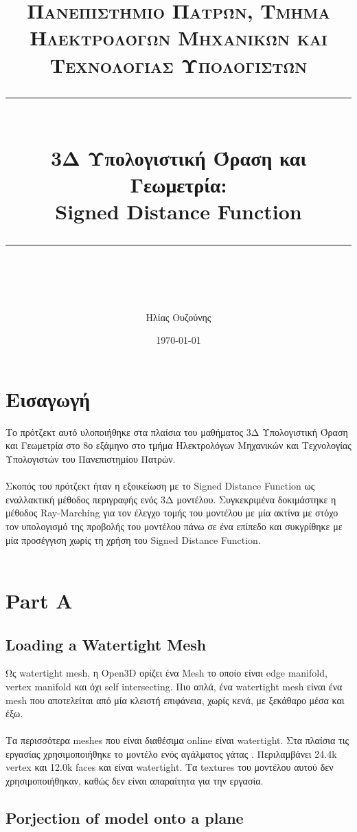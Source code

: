 \documentclass{report}
\title{	
	\normalfont\normalsize
	\textsc{Πανεπιστήμιο Πατρών, Τμήμα Ηλεκτρολόγων Μηχανικών και Τεχνολογίας Υπολογιστών}\\ %
	\vspace{25pt} %
	\rule{\linewidth}{0.5pt}\\ %
	\vspace{20pt} %
	{\huge 3Δ Υπολογιστική Όραση και Γεωμετρία: \\ Signed Distance Function}\\ %
	\vspace{12pt} %
	\rule{\linewidth}{2pt}\\ %
	\vspace{12pt} %
}
\author{\LARGE Ηλίας Ουζούνης \\ \en{up1083749}} %
\date{\normalsize\today} %
\begin{document}
\maketitle
\newpage

\sloppy
\tableofcontents
\newpage

\chapter{Εισαγωγή}
Το πρότζεκτ αυτό υλοποιήθηκε στα πλαίσια του μαθήματος 3Δ Υπολογιστική Όραση και Γεωμετρία στο 8ο εξάμηνο στο τμήμα Ηλεκτρολόγων
Μηχανικών και Τεχνολογίας Υπολογιστών του Πανεπιστημίου Πατρών.
\\\\
Σκοπός του πρότζεκτ ήταν η εξοικείωση με το Signed Distance Function ως εναλλακτική μέθοδος περιγραφής ενός 3Δ μοντέλου. 
Συγκεκριμένα δοκιμάστηκε η μέθοδος Ray-Marching για τον έλεγχο τομής του μοντέλου με μία ακτίνα με στόχο τον υπολογισμό
της προβολής του μοντέλου πάνω σε ένα επίπεδο και συκγρίθηκε με μία προσέγγιση χωρίς τη χρήση του Signed Distance Function.
\\\\

\chapter{Part A}
\section{Loading a Watertight Mesh}

Ως watertight mesh, η Open3D ορίζει ένα Mesh το οποίο είναι edge manifold, vertex manifold και όχι self intersecting. Πιο απλά,
ένα watertight mesh είναι ένα mesh που αποτελείται από μία κλειστή επιφάνεια, χωρίς κενά, με ξεκάθαρο μέσα και έξω. 
\\\\
Τα περισσότερα meshes που είναι διαθέσιμα online είναι watertight. Στα πλαίσια τις εργασίας χρησιμοποιήθηκε το μοντέλο ενός αγάλματος γάτας
\cite{concrete-cat-statue}. Περιλαμβάνει 24.4k vertex και 12.0k faces και είναι watertight.
Τα textures του μοντέλου αυτού δεν χρησιμοποιήθηκαν, καθώς δεν είναι απαραίτητα για την εργασία.


\section{Porjection of model onto a plane}
\end{document}
